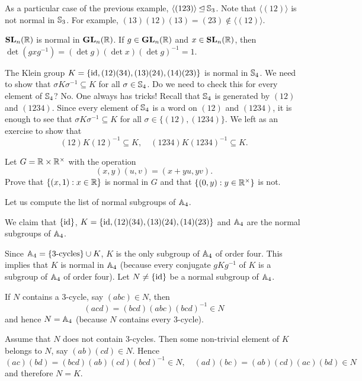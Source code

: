 \begin{example}
As a particular case of the previous example, 
$\langle (123)\rangle\unlhd\mathbb{S}_3$. Note that
$\langle (12)\rangle$ is not normal in $\mathbb{S}_3$.  
For example, $(13)(12)(13)=(23)\not\in\langle(12)\rangle$.
\end{example}

\begin{example}
$\mathbf{SL}_n(\mathbb{R})$ is normal in $\mathbf{GL}_n(\mathbb{R})$. If $g\in\mathbf{GL}_n(\mathbb{R})$ and $x\in\mathbf{SL}_n(\mathbb{R})$, then $\det(gxg^{-1})=(\det g)(\det x)(\det g)^{-1}=1$.
\end{example}

\begin{example}
The Klein group $K=\{\operatorname{id},(12)(34),(13)(24),(14)(23)\}$ is normal in
$\mathbb{S}_4$. We need to show that 
$\sigma K\sigma^{-1}\subseteq K$ for all $\sigma\in\mathbb{S}_4$. Do we need to check this for every element of $\mathbb{S}_4$? No. One always has tricks! 
Recall that $\mathbb{S}_4$ is generated by $(12)$ and $(1234)$. Since
every element of  $\mathbb{S}_4$ is a word on $(12)$ and 
$(1234)$,
it is enough to see that
$\sigma K\sigma^{-1}\subseteq K$ for all $\sigma\in\{(12),(1234)\}$. We left as an exercise to show that 
\[
(12)K(12)^{-1}\subseteq K,\quad
(1234)K(1234)^{-1}\subseteq K.
\]
\end{example}

\begin{exercise}
Let $G=\mathbb{R}\times\mathbb{R}^\times$ with the operation 
\[
(x,y)(u,v)=(x+yu,yv).
\]
Prove that $\{(x,1):x\in\mathbb{R}\}$ is normal in $G$ and that
$\{(0,y):y\in\mathbb{R}^\times\}$ is not. 
\end{exercise}

Let us compute the list of normal subgroups of $\mathbb{A}_4$.

\begin{example}
We claim that 
$\{\operatorname{id}\}$, $K=\{\operatorname{id},(12)(34),(13)(24),(14)(23)\}$ and $\mathbb{A}_4$ 
are the normal subgroups of $\mathbb{A}_4$.

Since $\mathbb{A}_4=\{\text{3-cycles}\}\cup K$, $K$ is the only subgroup
of $\mathbb{A}_4$ of order four. This implies that $K$ is normal in $\mathbb{A}_4$ (because every conjugate $gKg^{-1}$ of $K$ is a subgroup of 
$\mathbb{A}_4$ of order four). Let $N\ne\{\operatorname{id}\}$ be a normal subgroup of 
$\mathbb{A}_4$. 

If $N$ contains a 3-cycle, say 
$(abc)\in N$, then 
\[
(acd)=(bcd)(abc)(bcd)^{-1}\in N
\]
and hence $N=\mathbb{A}_4$ (because $N$ contains every 3-cycle). 

Assume that $N$ does not contain 3-cycles. 
Then some non-trivial element of $K$ belongs to $N$, say 
$(ab)(cd)\in N$. Hence 
\[
(ac)(bd)=(bcd)(ab)(cd)(bcd)^{-1}\in N,\quad
(ad)(bc)=(ab)(cd)(ac)(bd)\in N
\]
and therefore $N=K$.
\end{example}

